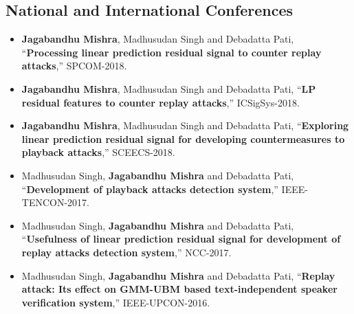 \begin{spacing}{1.5}


\subsection*{National and International Conferences}
\begin{itemize}
\item \textbf{Jagabandhu Mishra}, Madhusudan Singh and Debadatta Pati, \textquotedblleft{}\textbf{Processing linear prediction residual
signal to counter replay attacks},''
SPCOM-2018.

\item \textbf{Jagabandhu Mishra}, Madhusudan Singh and Debadatta Pati, \textquotedblleft{}\textbf{LP residual features to counter replay attacks},''
ICSigSys-2018.

\item \textbf{Jagabandhu Mishra}, Madhusudan Singh and Debadatta Pati, \textquotedblleft{}\textbf{Exploring linear prediction residual signal for
developing countermeasures to playback attacks},''
SCEECS-2018.

\item Madhusudan Singh, \textbf{Jagabandhu Mishra} and Debadatta Pati, \textquotedblleft{}\textbf{Development of playback attacks detection system},''
IEEE-TENCON-2017.

\item Madhusudan Singh, \textbf{Jagabandhu Mishra} and Debadatta Pati, \textquotedblleft{}\textbf{Usefulness of linear prediction residual signal for
development of replay attacks detection system},''
NCC-2017.

\item Madhusudan Singh, \textbf{Jagabandhu Mishra} and Debadatta Pati, \textquotedblleft{}\textbf{Replay attack: Its effect on GMM-UBM based
text-independent speaker verification system},''
IEEE-UPCON-2016.


\end{itemize}



\end{spacing}
